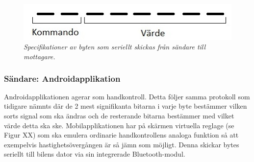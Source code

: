 \documentclass[a4paper]{article}
\begin{document}
\begin{figure}[H]
\includegraphics[scale=1]{aByteComVal.jpg}
\centering
\caption{\it Specifikationer av byten som seriellt skickas från sändare till mottagare.}
\end{figure} 








\subsubsection{Sändare: Androidapplikation}
Androidapplikationen agerar som handkontroll. Detta följer samma protokoll som tidigare nämnts där de 2 mest signifikanta bitarna i varje byte bestämmer vilken sorts signal som ska ändras och de resterande bitarna bestämmer med vilket värde detta ska ske. Mobilapplikationen har på skärmen virtuella reglage (se Figur XX) som ska emulera ordinarie handkontrollens analoga funktion så att exempelvis hastighetsövergången är så jämn som möjligt. Denna skickar bytes seriellt till bilens dator via sin integrerade Bluetooth-modul.
\end{document}
